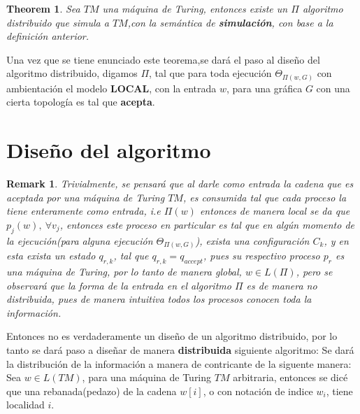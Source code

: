 \documentclass[10pt]{report}
\newtheorem*{remark}{Remark}
\newtheorem{theorem}{Theorem}
\begin{document}
    \begin{theorem}
        Sea $TM$ una máquina de Turing, entonces existe un $\Pi$ algoritmo distribuido que simula
        a $TM$,\space con la semántica de \textbf{simulación}, con base a la definición anterior.
    \end{theorem}
    Una vez que se tiene enunciado este teorema,se dará el paso al diseño del algoritmo distribuido,
    digamos $\Pi$, tal que para toda ejecución $\Theta_{\Pi(w,G)}$ con ambientación el modelo \textbf{LOCAL}, con la entrada $w$, para una gráfica $G$ con una
    cierta topología es tal que \textbf{acepta}.
    \newpage

    \section{Diseño del algoritmo}\label{sec:diseño-del-algoritmo}
    \begin{remark}
        Trivialmente, se pensará que al darle como entrada la cadena que es aceptada por una máquina de Turing $TM$,\space
        es consumida tal que cada proceso la tiene enteramente como entrada, i.e $\Pi(w)$ entonces de manera local se da
        que $p_{j}(w),\ \forall v_{j}$, entonces este proceso en particular es tal que en algún momento de la ejecución(para alguna ejecución $\Theta_{\Pi(w,G)}$),
        exista una configuración $C_{k}$, y en esta exista un estado $q_{r,k}$, tal que $q_{r,k} = q_{accept}$, pues su respectivo proceso $p_{r}$ es una máquina de Turing,
        por lo tanto de manera global, $w\in L(\Pi)$, pero se observará que la forma de la entrada en el algoritmo $\Pi$
        es de manera no distribuida, pues de manera intuitiva todos los procesos conocen toda la información.
    \end{remark}
    Entonces no es verdaderamente un diseño de un algoritmo distribuido, por lo tanto se dará paso a diseñar de manera
    \textbf{distribuida} siguiente algoritmo:
    \newline
    Se dará la distribución de la información a manera de contricante de la siguente manera:\newline
    \hfill
    Sea $w\in L(TM)$, para una máquina de Turing $TM$ arbitraria, entonces se dicé que una rebanada(pedazo) de la cadena
    $w[i]$, o con notación de indice $w_{i}$, tiene localidad $i$.\newline
\end{document}
